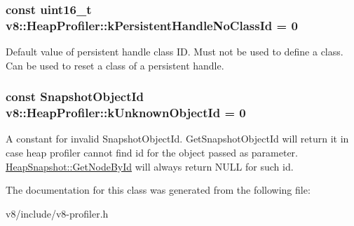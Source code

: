 \subsubsection[{k\+Persistent\+Handle\+No\+Class\+Id}]{\setlength{\rightskip}{0pt plus 5cm}const uint16\+\_\+t v8\+::\+Heap\+Profiler\+::k\+Persistent\+Handle\+No\+Class\+Id = 0\hspace{0.3cm}{\ttfamily [static]}}\label{classv8_1_1HeapProfiler_a272c9af3ea5cd90a2737af3d22a7eb78}
Default value of persistent handle class I\+D. Must not be used to define a class. Can be used to reset a class of a persistent handle. \hypertarget{classv8_1_1HeapProfiler_abf2b9d8facb18473f9b124ab8baf5786}{}
\subsubsection[{k\+Unknown\+Object\+Id}]{\setlength{\rightskip}{0pt plus 5cm}const Snapshot\+Object\+Id v8\+::\+Heap\+Profiler\+::k\+Unknown\+Object\+Id = 0\hspace{0.3cm}{\ttfamily [static]}}\label{classv8_1_1HeapProfiler_abf2b9d8facb18473f9b124ab8baf5786}
A constant for invalid Snapshot\+Object\+Id. Get\+Snapshot\+Object\+Id will return it in case heap profiler cannot find id for the object passed as parameter. \hyperlink{classv8_1_1HeapSnapshot_a023696f94fe538380922bf2c40c97b7b}{Heap\+Snapshot\+::\+Get\+Node\+By\+Id} will always return N\+U\+L\+L for such id. 

The documentation for this class was generated from the following file\+:\begin{DoxyCompactItemize}
\item 
v8/include/v8-\/profiler.\+h\end{DoxyCompactItemize}
